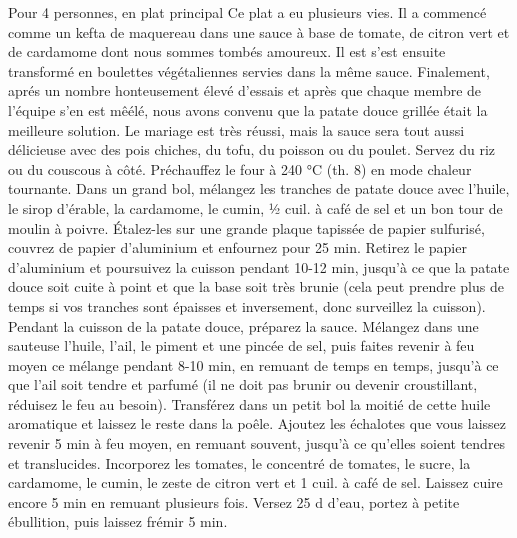 \ingredient{}Pour 4 personnes, en plat principal
\ingredient{}Ce plat a eu plusieurs vies. Il a commencé comme un kefta de maquereau dans une sauce à base de tomate, de citron vert et de cardamome dont nous sommes tombés amoureux. Il est s'est ensuite transformé en boulettes végétaliennes servies dans la même sauce. Finalement, aprés un nombre honteusement élevé d'essais et après que chaque membre de l'équipe s'en est mêélé, nous avons convenu que la patate douce grillée était la meilleure solution. Le mariage est très réussi, mais la sauce sera tout aussi délicieuse avec des pois chiches, du tofu, du poisson ou du poulet. Servez du riz ou du couscous à côté.
\ingredient{}Préchauffez le four à 240 °C (th. 8) en mode chaleur tournante.
Dans un grand bol, mélangez les tranches de patate douce avec l'huile, le sirop d'érable, la cardamome, le cumin, ½ cuil. à café de sel et un bon tour de moulin à poivre. Étalez-les sur une grande plaque tapissée de papier sulfurisé, couvrez de papier d'aluminium et enfournez pour 25 min. Retirez le papier d'aluminium et poursuivez la cuisson pendant 10-12 min, jusqu'à ce que la patate douce soit cuite à point et que la base soit très brunie (cela peut prendre plus de temps si vos tranches sont épaisses et inversement, donc surveillez la cuisson).
Pendant la cuisson de la patate douce, préparez la sauce. Mélangez dans une sauteuse l'huile, l'ail, le piment et une pincée de sel, puis faites revenir à feu moyen ce mélange pendant 8-10 min, en remuant de temps en temps, jusqu'à ce que l'ail soit tendre et parfumé (il ne doit pas brunir ou devenir croustillant, réduisez le feu au besoin). Transférez dans un petit bol la moitié de cette huile aromatique et laissez le reste dans la poêle. Ajoutez les échalotes que vous laissez revenir 5 min à feu moyen, en remuant souvent, jusqu'à ce qu'elles soient tendres et translucides. Incorporez les tomates, le concentré de tomates, le sucre, la cardamome, le cumin, le zeste de citron vert et 1 cuil. à café de sel. Laissez cuire encore 5 min en remuant plusieurs fois. Versez 25 d d'eau, portez à petite ébullition, puis laissez frémir 5 min.
